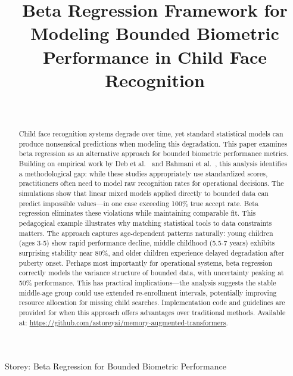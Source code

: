 \documentclass[10pt,journal,compsoc]{IEEEtran}
\begin{document}
\title{Beta Regression Framework for Modeling Bounded Biometric Performance in Child Face Recognition}

\author{\\
}

%
{Storey: Beta Regression for Bounded Biometric Performance}

\maketitle

\begin{abstract}
Child face recognition systems degrade over time, yet standard statistical models can produce nonsensical predictions when modeling this degradation. This paper examines beta regression as an alternative approach for bounded biometric performance metrics. Building on empirical work by Deb et al.~\cite{deb2018} and Bahmani et al.~\cite{bahmani2023}, this analysis identifies a methodological gap: while these studies appropriately use standardized scores, practitioners often need to model raw recognition rates for operational decisions. The simulations show that linear mixed models applied directly to bounded data can predict impossible values---in one case exceeding 100\% true accept rate. Beta regression eliminates these violations while maintaining comparable fit. This pedagogical example illustrates why matching statistical tools to data constraints matters. The approach captures age-dependent patterns naturally: young children (ages 3-5) show rapid performance decline, middle childhood (5.5-7 years) exhibits surprising stability near 80\%, and older children experience delayed degradation after puberty onset. Perhaps most importantly for operational systems, beta regression correctly models the variance structure of bounded data, with uncertainty peaking at 50\% performance. This has practical implications---the analysis suggests the stable middle-age group could use extended re-enrollment intervals, potentially improving resource allocation for missing child searches. Implementation code and guidelines are provided for when this approach offers advantages over traditional methods. Available at: \url{https://github.com/astoreyai/memory-augmented-transformers}.
\end{abstract}
\end{document}
